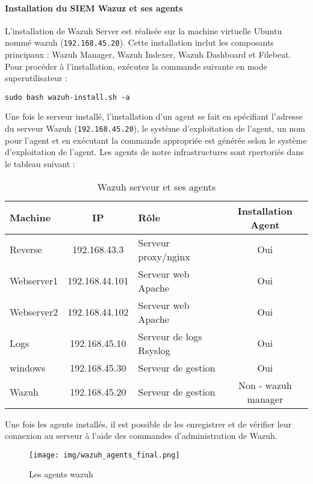 \documentclass[a4paper,12pt]{report}
\begin{document}
\paragraph{Installation du SIEM Wazuz et ses agents}

L'installation de Wazuh Server est réalisée sur la machine virtuelle Ubuntu nommé wazuh (\texttt{192.168.45.20}). Cette installation inclut les composants principaux : Wazuh Manager, Wazuh Indexer, Wazuh Dashboard et Filebeat. Pour procéder à l'installation, exécutez la commande suivante en mode superutilisateur :

\begin{lstlisting}
sudo bash wazuh-install.sh -a
\end{lstlisting}

Une fois le serveur installé, l'installation d'un agent se fait en spécifiant l'adresse du serveur Wazuh (\texttt{192.168.45.20}), le système d'exploitation de l'agent, un nom pour l'agent et en exécutant la commande appropriée  est générée selon le système d'exploitation de l'agent. Les agents de notre infrastructures sont rpertoriés dans le tableau suivant :


\begin{table}[H]
    \centering
    \begin{tabular}{|l|c|l|c|}
        \hline
        \textbf{Machine} & \textbf{IP} & \textbf{Rôle} & \textbf{Installation Agent} \\
        \hline
        Reverse & 192.168.43.3 & Serveur proxy/nginx &  Oui \\
        Webserver1 & 192.168.44.101 & Serveur web Apache &  Oui \\
        Webserver2 & 192.168.44.102 & Serveur web Apache &  Oui \\
        Logs & 192.168.45.10 & Serveur de logs Rsyslog & Oui \\
         windows & 192.168.45.30 & Serveur de gestion &  Oui \\
        Wazuh & 192.168.45.20 & Serveur de gestion &  Non - wazuh manager \\
        \hline
    \end{tabular}
    \caption{Wazuh serveur et ses agents}
    \label{tab:wazuh_agents}
\end{table}


Une fois les agents installés, il est possible de les enregistrer et de vérifier leur connexion au serveur à l'aide des commandes d'administration de Wazuh.

\begin{figure}[H] 
\label{wazuh-agents}
    \centering
    \texttt{[image: img/wazuh\_agents\_final.png]} 
    \caption{Les agents wazuh}
\end{figure}
\end{document}
